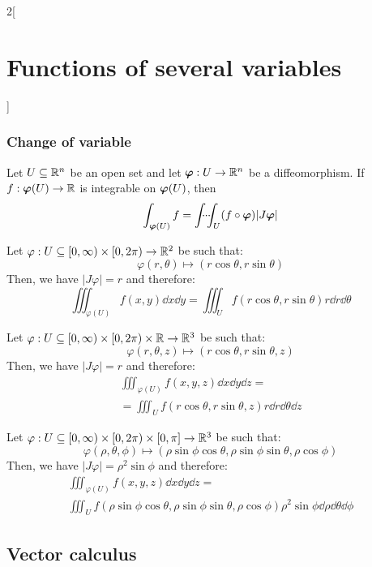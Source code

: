 \documentclass[../../../main_math.tex]{subfiles}
\begin{document}
\begin{multicols}{2}[\section{Functions of several variables}]
  \subsubsection{Change of variable}
  \begin{theorem}
    Let $U\subseteq\mathbb{R}^n$ be an open set and let $\boldsymbol{\mathrm{\varphi}}:U\rightarrow\mathbb{R}^n$ be a diffeomorphism. If $f:\boldsymbol{\mathrm{\varphi}}(U)\rightarrow\mathbb{R} $ is integrable on $\boldsymbol{\mathrm{\varphi}}(U)$, then $$\int_{\vf{\varphi}(U)} f=\dotsint_U(f\circ\vf{\varphi})|J\vf{\varphi}|$$
  \end{theorem}
  \begin{corollary}
    Let $\varphi:U\subseteq[0,\infty)\times[0,2\pi)\rightarrow\mathbb{R}^2 $ be such that:
    $$\varphi(r,\theta)\longmapsto(r\cos\theta,r\sin\theta)$$
    Then, we have $|J\varphi|=r$ and therefore: $$\iiint_{\varphi(U)}f(x,y)\dd{x}\dd{y}=\iiint_Uf(r\cos\theta,r\sin\theta)r\dd{r} \dd{\theta}$$
  \end{corollary}
  \begin{corollary}
    Let $\varphi:U\subseteq[0,\infty)\times[0,2\pi)\times\mathbb{R} \rightarrow\mathbb{R}^3 $ be such that: $$\varphi(r,\theta,z)\longmapsto(r\cos\theta,r\sin\theta,z)$$
    Then, we have $|J\varphi|=r$ and therefore:
    \begin{multline*}
      \iiint_{\varphi(U)}f(x,y,z)\dd{x}\dd{y}\dd{z}=\\=\iiint_Uf(r\cos\theta,r\sin\theta,z)r\dd{r} \dd{\theta} \dd{z}
    \end{multline*}
  \end{corollary}
  \begin{corollary}
    Let $\varphi:U\subseteq[0,\infty)\times[0,2\pi)\times[0,\pi]\rightarrow\mathbb{R}^3 $ be such that: $$\varphi(\rho,\theta,\phi)\longmapsto(\rho\sin\phi\cos\theta,\rho\sin\phi\sin\theta,\rho\cos\phi)$$
    Then, we have $|J\varphi|=\rho^2\sin\phi$ and therefore:
    \begin{multline*}
      \iiint_{\varphi(U)}f(x,y,z)\dd{x}\dd{y}\dd{z}=\\\iiint_Uf(\rho\sin\phi\cos\theta,\rho\sin\phi\sin\theta,\rho\cos\phi)\rho^2\sin\phi \dd{\rho} \dd{\theta} \dd{\phi}
    \end{multline*}
  \end{corollary}
  \subsection{Vector calculus}

\end{multicols}
\end{document}
